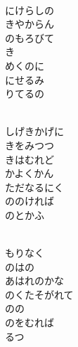 \documentclass[10pt,b5j]{tarticle} %
\begin{document}
\vspace{1.5em} %
\newcommand{\linespace}{0.5em} %
\newcommand{\blocksize}{0.5\hsize} %
\newcommand{\itemmargin}{6em} %
\begin{enumerate} %
    \setlength{\itemindent}{\itemmargin} %
    \begin{minipage}[c]{\blocksize}
    
        \vspace{\linespace}
        \item~\\
        にけらしの\\
        きやからん\\
        のもろびて\\
        き\\
        めくのに\\
        にせるみ\\
        りてるの
        
        \vspace{\linespace}
        \item~\\
        しげきかげに\\
        きをみつつ\\
        きはむれど\\
        かよくかん\\
        ただなるにく\\
        ののければ\\
        のとかふ
        
        \vspace{\linespace}
        \item~\\
        もりなく\\
        のはの\\
        あはれのかな\\
        のくたそがれて\\
        のの\\
        のをむれば\\
        るつ
        

\end{minipage}
\end{enumerate}
\end{document}
